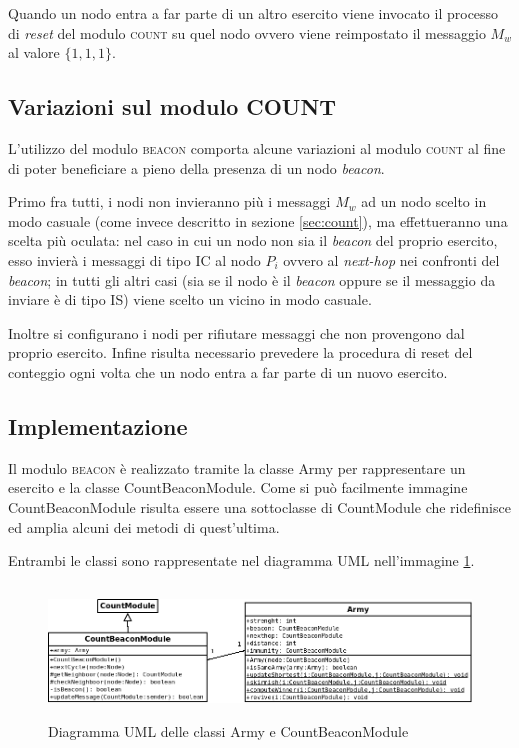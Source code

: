 \documentclass[a4paper,12pt]{article}
\begin{document}
Quando un nodo entra a far parte di un altro esercito viene invocato il processo di \emph{reset} del modulo \textsc{count} su quel nodo ovvero viene reimpostato il messaggio $M_w$ al valore $\{ 1, 1, 1 \}$.

\subsection{Variazioni sul modulo COUNT}

L'utilizzo del modulo \textsc{beacon} comporta alcune variazioni al modulo \textsc{count} al fine di poter beneficiare a pieno della presenza di un nodo \emph{beacon}.

Primo fra tutti, i nodi non invieranno pi\`u i messaggi $M_w$ ad un nodo scelto in modo casuale (come invece descritto in sezione \ref{sec:count}), ma effettueranno una scelta pi\`u oculata: nel caso in cui un nodo non sia il \emph{beacon} del proprio esercito, esso invier\`a i messaggi di tipo IC al nodo $P_i$ ovvero al \emph{next-hop} nei confronti del \emph{beacon}; in tutti gli altri casi (sia se il nodo \`e il \emph{beacon} oppure se il messaggio da inviare \`e di tipo IS) viene scelto un vicino in modo casuale.

Inoltre si configurano i nodi per rifiutare messaggi che non provengono dal proprio esercito. Infine risulta necessario prevedere la procedura di reset del conteggio ogni volta che un nodo entra a far parte di un nuovo esercito.

\subsection{Implementazione}

Il modulo \textsc{beacon} \`e realizzato tramite la classe \textsf{Army} per rappresentare un esercito e la classe \textsf{CountBeaconModule}. Come si pu\`o facilmente immagine \textsf{CountBeaconModule} risulta essere una sottoclasse di \textsf{CountModule} che ridefinisce ed amplia alcuni dei metodi di quest'ultima.

Entrambi le classi sono rappresentate nel diagramma UML nell'immagine \ref{img:beacon}. 

\begin{figure}[ht]
\centering
\includegraphics[height=3.5cm]{beacon_uml.png}
\caption{Diagramma UML delle classi \textsf{Army} e \textsf{CountBeaconModule}}
\label{img:beacon}
\end{figure}
\end{document}
